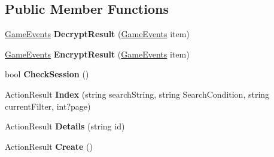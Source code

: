 \subsection*{Public Member Functions}
\begin{DoxyCompactItemize}
\item 
\hyperlink{class_cloud_bread_admin_web_1_1_game_events}{Game\+Events} {\bfseries Decrypt\+Result} (\hyperlink{class_cloud_bread_admin_web_1_1_game_events}{Game\+Events} item)\hypertarget{class_cloud_bread_admin_web_1_1_controllers_1_1_game_events_controller_aa998d6457a3edb40fc2ac5eb3d7217bd}{}\label{class_cloud_bread_admin_web_1_1_controllers_1_1_game_events_controller_aa998d6457a3edb40fc2ac5eb3d7217bd}

\item 
\hyperlink{class_cloud_bread_admin_web_1_1_game_events}{Game\+Events} {\bfseries Encrypt\+Result} (\hyperlink{class_cloud_bread_admin_web_1_1_game_events}{Game\+Events} item)\hypertarget{class_cloud_bread_admin_web_1_1_controllers_1_1_game_events_controller_ae132069bf87b71cf7074deae4d1b381c}{}\label{class_cloud_bread_admin_web_1_1_controllers_1_1_game_events_controller_ae132069bf87b71cf7074deae4d1b381c}

\item 
bool {\bfseries Check\+Session} ()\hypertarget{class_cloud_bread_admin_web_1_1_controllers_1_1_game_events_controller_a6716950665e3ed8eef8addbc65413251}{}\label{class_cloud_bread_admin_web_1_1_controllers_1_1_game_events_controller_a6716950665e3ed8eef8addbc65413251}

\item 
Action\+Result {\bfseries Index} (string search\+String, string Search\+Condition, string current\+Filter, int?page)\hypertarget{class_cloud_bread_admin_web_1_1_controllers_1_1_game_events_controller_a5d2c29c4fad527acc40b52078e2eec07}{}\label{class_cloud_bread_admin_web_1_1_controllers_1_1_game_events_controller_a5d2c29c4fad527acc40b52078e2eec07}

\item 
Action\+Result {\bfseries Details} (string id)\hypertarget{class_cloud_bread_admin_web_1_1_controllers_1_1_game_events_controller_a8233163d3d36932f0c8b28940958aaf5}{}\label{class_cloud_bread_admin_web_1_1_controllers_1_1_game_events_controller_a8233163d3d36932f0c8b28940958aaf5}

\item 
Action\+Result {\bfseries Create} ()\hypertarget{class_cloud_bread_admin_web_1_1_controllers_1_1_game_events_controller_a623aedeac0dbef7fb7c8cf25208abeef}{}\label{class_cloud_bread_admin_web_1_1_controllers_1_1_game_events_controller_a623aedeac0dbef7fb7c8cf25208abeef}


\end{DoxyCompactItemize}
